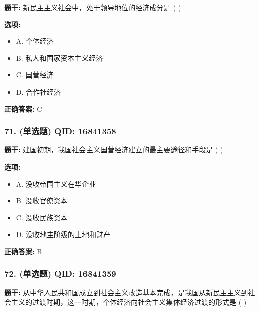 \documentclass[12pt,UTF8]{ctexart}
\begin{document}
\textbf{题干:}
新民主主义社会中，处于领导地位的经济成分是 ( )

\textbf{选项:}
\begin{itemize}[leftmargin=*]

  \item A. 个体经济

  \item B. 私人和国家资本主义经济

  \item C. 国营经济

  \item D. 合作社经济

\end{itemize}

\textbf{正确答案:}
C

\vspace{0.3em}\hrulefill\vspace{0.7em}

\subsubsection*{71. (单选题) \small QID: 16841358}

\textbf{题干:}
建国初期，我国社会主义国营经济建立的最主要途径和手段是 ( )

\textbf{选项:}
\begin{itemize}[leftmargin=*]

  \item A. 没收帝国主义在华企业

  \item B. 没收官僚资本

  \item C. 没收民族资本

  \item D. 没收地主阶级的土地和财产

\end{itemize}

\textbf{正确答案:}
B

\vspace{0.3em}\hrulefill\vspace{0.7em}

\subsubsection*{72. (单选题) \small QID: 16841359}

\textbf{题干:}
从中华人民共和国成立到社会主义改造基本完成，是我国从新民主主义到社会主义的过渡时期，这一时期，个体经济向社会主义集体经济过渡的形式是 ( )
\end{document}
